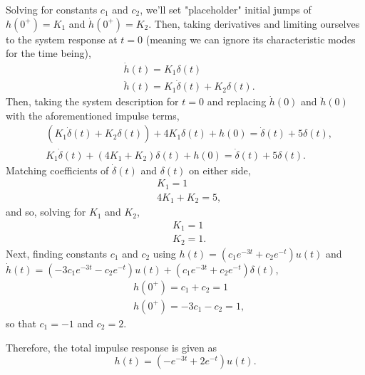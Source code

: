 \documentclass{article}
\begin{document}
\begin{enumerate}[label=\thesubsubsection]
\[		\]
		Solving for constants \(c_1\) and \(c_2\), we'll set "placeholder" initial jumps of \(h(0^+) = K_1\) and \(\dot{h}(0^+) = K_2\). Then, taking derivatives and limiting ourselves to the system response at \(t=0\) (meaning we can ignore its characteristic modes for the time being), 
		\begin{align*}
			&\dot{h}(t) = K_1\delta(t) \\
			&\ddot{h}(t) = K_1\dot{\delta}(t) + K_2\delta(t).
		\end{align*}
		Then, taking the system description for \(t=0\) and replacing \(\dot{h}(0)\) and \(\ddot{h}(0)\) with the aforementioned impulse terms,
		\begin{align*}
			&(K_1\dot{\delta}(t) + K_2\delta(t)) + 4K_1\delta(t) + h(0) = \dot{\delta}(t) + 5\delta(t), \\
			&K_1\dot{\delta}(t) + (4K_1 + K_2)\delta(t) + h(0) = \dot{\delta}(t) + 5\delta(t).
		\end{align*}
		Matching coefficients of \(\dot{\delta}(t)\) and \(\delta(t)\) on either side, 
		\begin{align*}
			&K_1 = 1 \\
			&4K_1 + K_2 = 5,
		\end{align*}
		and so, solving for \(K_1\) and \(K_2\), 
		\begin{align*}
			&K_1 = 1 \\
			&K_2 = 1.
		\end{align*}
		Next, finding constants \(c_1\) and \(c_2\) using \(h(t) = (c_1e^{-3t} + c_2e^{-t})u(t)\) and \(\dot{h}(t) = (-3c_1e^{-3t} - c_2e^{-t})u(t) + (c_1e^{-3t}+c_2e^{-t})\delta(t)\), 
		\begin{align*}
			&h(0^+) = c_1 + c_2 = 1 \\
			&h(0^+) = -3c_1 - c_2 = 1,
		\end{align*}
		so that \(c_1 = -1\) and \(c_2 = 2\).

		Therefore, the total impulse response is given as 
		\[
			h(t) = (-e^{-3t} + 2e^{-t})u(t).
		\]
		

\end{enumerate}
\end{document}
